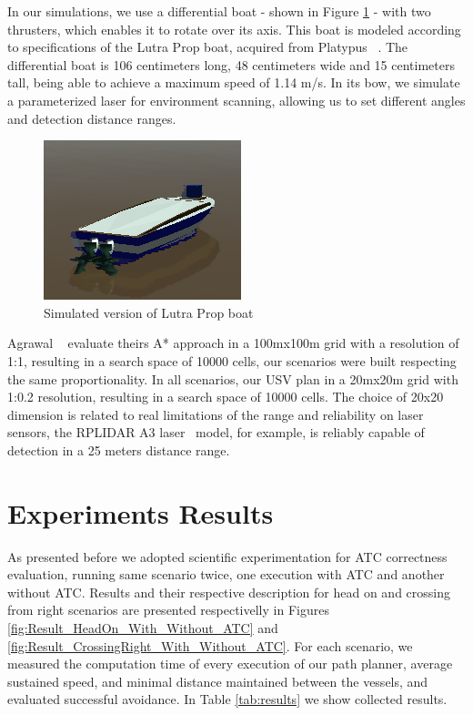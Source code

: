     In our simulations, we use a differential boat - shown in Figure \ref{fig:diffboat} - with two thrusters, which enables it to rotate over its axis. This boat is modeled according to specifications of the Lutra Prop boat, acquired from Platypus ~\cite{PlatypusLLC}. The differential boat is 106 centimeters long, 48 centimeters wide and 15 centimeters tall, being able to achieve a maximum speed of 1.14 m/s. In its bow, we simulate a parameterized laser for environment scanning, allowing us to set different angles and detection distance ranges.
    
    \begin{figure}[H]
        \centering
        \includegraphics[scale=0.75]{figs/diffboat.png}
        \caption{Simulated version of Lutra Prop boat}
        \label{fig:diffboat}
    \end{figure}
    
    Agrawal \etal ~\cite{Agrawal2015COLREGS} evaluate theirs A* approach in a 100mx100m grid with a resolution of 1:1, resulting in a search space of 10000 cells, our scenarios were built respecting the same proportionality. In all scenarios, our \ac{USV} plan in a 20mx20m grid with 1:0.2 resolution, resulting in a search space of 10000 cells. The choice of 20x20 dimension is related to real limitations of the range and reliability on laser sensors, the RPLIDAR A3 laser~\cite{RPLidarA3} model, for example, is reliably capable of detection in a 25 meters distance range.
    
    \section{Experiments Results}
    
        As presented before we adopted scientific experimentation for \ac{ATC} correctness evaluation, running same scenario twice, one execution with \ac{ATC} and another without \ac{ATC}. Results and their respective description for head on and crossing from right scenarios are presented respectivelly in Figures \ref{fig:Result_HeadOn_With_Without_ATC} and \ref{fig:Result_CrossingRight_With_Without_ATC}. For each scenario, we measured the computation time of every execution of our path planner, average sustained speed, and minimal distance maintained between the vessels, and evaluated successful avoidance. In Table \ref{tab:results} we show collected results.
        
